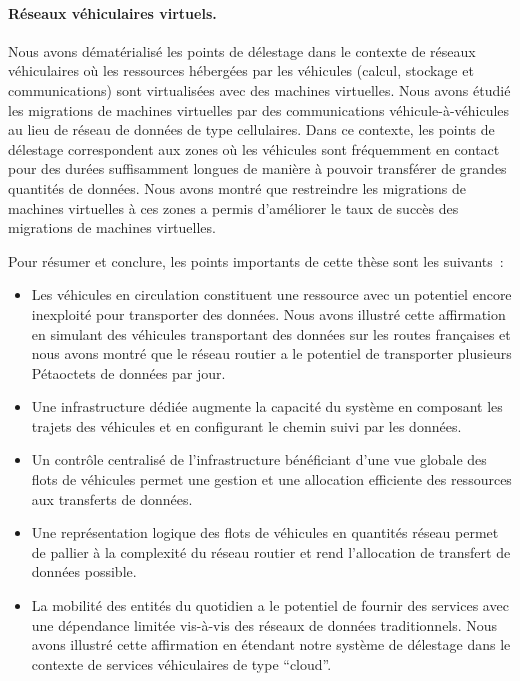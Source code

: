  
\paragraph{Réseaux véhiculaires virtuels.} 
Nous avons dématérialisé les points de délestage dans le contexte de réseaux véhiculaires où les ressources hébergées par les véhicules (\ie calcul, stockage et communications) sont virtualisées avec des machines virtuelles. Nous avons étudié les migrations de machines virtuelles par des communications véhicule-à-véhicules au lieu de réseau de données de type cellulaires. Dans ce contexte, les points de délestage correspondent aux zones où les véhicules sont fréquemment en contact pour des durées suffisamment longues de manière à pouvoir transférer de grandes quantités de données. Nous avons montré que restreindre les migrations de machines virtuelles à ces zones a permis d’améliorer le taux de succès des migrations de machines virtuelles. 
 
 
Pour résumer et conclure, les points importants de cette thèse sont les suivants~: 
\begin{itemize} 
 
    \item Les véhicules en circulation constituent une ressource avec un potentiel encore inexploité pour transporter des données. Nous avons illustré cette affirmation en simulant des véhicules transportant des données sur les routes françaises et nous avons montré que le réseau routier a le potentiel de transporter plusieurs Pétaoctets de données par jour. 

    \item Une infrastructure dédiée augmente la capacité du système en composant les trajets des véhicules et en configurant le chemin suivi par les données. 

    \item Un contrôle centralisé de l’infrastructure bénéficiant d’une vue globale des flots de véhicules permet une gestion et une allocation efficiente des ressources aux transferts de données. 

    \item Une représentation logique des flots de véhicules en quantités réseau permet de pallier à la complexité du réseau routier et rend l’allocation de transfert de données possible. 

    \item La mobilité des entités du quotidien a le potentiel de fournir des services avec une dépendance limitée vis-à-vis des réseaux de données traditionnels. Nous avons illustré cette affirmation en étendant notre système de délestage dans le contexte de services véhiculaires de type ``cloud''. 

\end{itemize} 
 